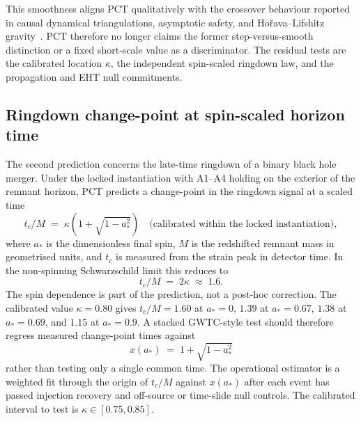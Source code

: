 ﻿\documentclass[12pt,a4paper]{article}
\theoremstyle{definition}
\begin{document}
This smoothness aligns PCT qualitatively with the crossover behaviour reported in causal dynamical triangulations, asymptotic safety, and Ho\v{r}ava--Lifshitz gravity~\citep{cdt,ambjorn2,lauscher,horava,horava2}. PCT therefore no longer claims the former step-versus-smooth distinction or a fixed short-scale value as a discriminator. The residual tests are the calibrated location $\kappa$, the independent spin-scaled ringdown law, and the propagation and EHT null commitments.

\subsection[Ringdown change-point at spin-scaled horizon time]{Ringdown change-point at spin-scaled horizon time}
\label{sec:pred_ringdown}

The second prediction concerns the late-time ringdown of a binary black hole merger. Under the locked instantiation with A1--A4 holding on the exterior of the remnant horizon, PCT predicts a change-point in the ringdown signal at a scaled time
\[
t_c/M \;=\; \kappa\left(1+\sqrt{1-a_\ast^2}\right) \quad \text{(calibrated within the locked instantiation)},
\]
where $a_\ast$ is the dimensionless final spin, $M$ is the redshifted remnant mass in geometrised units, and $t_c$ is measured from the strain peak in detector time. In the non-spinning Schwarzschild limit this reduces to
\[
t_c/M \;=\; 2\kappa \;\approx\; 1.6.
\]
The spin dependence is part of the prediction, not a post-hoc correction. The calibrated value $\kappa=0.80$ gives $t_c/M=1.60$ at $a_\ast=0$, $1.39$ at $a_\ast=0.67$, $1.38$ at $a_\ast=0.69$, and $1.15$ at $a_\ast=0.9$. A stacked GWTC-style test should therefore regress measured change-point times against
\[
x(a_\ast) \;=\; 1+\sqrt{1-a_\ast^2}
\]
rather than testing only a single common time. The operational estimator is a weighted fit through the origin of $t_c/M$ against $x(a_\ast)$ after each event has passed injection recovery and off-source or time-slide null controls. The calibrated interval to test is $\kappa\in[0.75,0.85]$.
\end{document}
